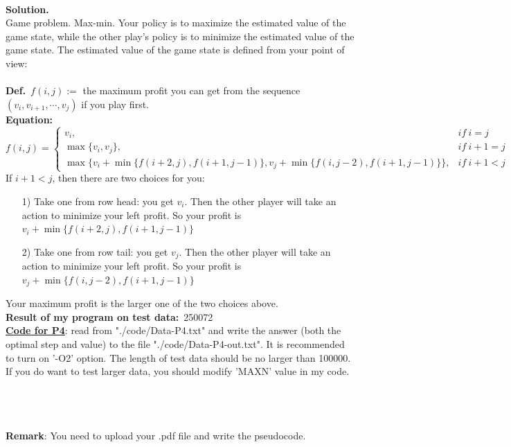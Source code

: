\documentclass{article}
\newtheorem*{solution}{Solution}
\renewenvironment{solution}[1][Solution]{~\\ \textbf{#1.}}{~\\}
\newcommand{\myblock}[2]{\textbf{#1}\ {#2}}
\begin{document}
\begin{enumerate}
    \begin{solution}~\\
    Game problem. Max-min. Your policy is to maximize the estimated value of the game state, while the other play's policy is to minimize the estimated value of the game state. The estimated value of the game state is defined from your point of view:\\~\\
    \myblock{Def.}{$f(i,j) :=$ the maximum profit you can get from the sequence $(v_i,v_{i+1},\cdots,v_{j})$ if you play first.}\\
    \myblock{Equation:}{$$f(i,j) = \left\{\begin{array}{ll}v_i, & if\ i=j\\ \max\{v_i,v_j\}, & if\ i+1=j\\\max\{v_i+\min\{f(i+2,j), f(i+1,j-1)\}, v_j+\min\{f(i,j-2), f(i+1,j-1)\}\}, & if\ i+1<j \end{array}\right.$$}
    If $i+1<j$, then there are two choices for you:\begin{itemize}
        \item [1)] Take one from row head: you get $v_i$. Then the other player will take an action to minimize your left profit. So your profit is $v_i+\min\{f(i+2,j), f(i+1,j-1)\}$
        \item [2)] Take one from row tail: you get $v_j$. Then the other player will take an action to minimize your left profit. So your profit is $v_j+\min\{f(i,j-2), f(i+1,j-1)\}$
    \end{itemize}
    Your maximum profit is the larger one of the two choices above.\\
    \myblock{Result of my program on test data:}{250072}\\
    \href{run:./code/main4.cpp}{\textbf{Code for P4}}: read from "./code/Data-P4.txt" and write the answer (both the optimal step and value) to the file "./code/Data-P4-out.txt". It is recommended to turn on '-O2' option. The length of test data should be no larger than  100000. If you do want to test larger data, you should modify 'MAXN' value in my code.
    \end{solution}

~\\
~\\


\textbf{Remark}: You need to upload your .pdf file and write the pseudocode.
\end{enumerate}
\end{document}
